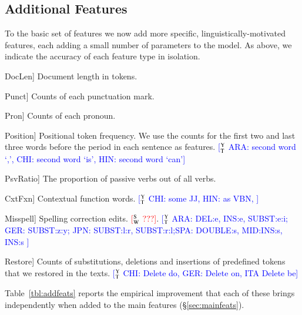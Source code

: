 \documentclass[11pt,letterpaper]{article}
\newcommand{\ensuretext}[1]{#1}
\newcommand{\swmarker}{\ensuretext{\textcolor{red}{\ensuremath{^{\textsc{S}}_{\textsc{W}}}}}}
\newcommand{\ytmarker}{\ensuretext{\textcolor{blue}{\ensuremath{^{\textsc{Y}}_{\textsc{T}}}}}}
\newcommand{\arkcomment}[3]{\ensuretext{\textcolor{#3}{[#1 #2]}}}
\newcommand{\sw}[1]{\arkcomment{\swmarker}{#1}{red}}
\newcommand{\yt}[1]{\arkcomment{\ytmarker}{#1}{blue}}
\newcommand{\Sref}[1]{\S\ref{#1}}
\newcommand{\Tref}[1]{Table~\ref{#1}}
\newcommand{\feat}[1]{\textsmaller[.5]{\textsf{#1}}} %
\begin{document}
\subsection{Additional Features}\label{sec:addfeats}
To the basic set of features we now add more specific,
linguistically-motivated features, each adding a small number of
parameters to the model.  As above, we indicate the accuracy of each
feature type in isolation.

\begin{compactdesc}
\item[\feat{DocLen}] Document length in tokens.
\item[\feat{Punct}] Counts of each punctuation mark. 
\item[\feat{Pron}] Counts of each pronoun.
\item[\feat{Position}] Positional token frequency. We use the counts
  for the first two and last three words before the period in each
  sentence as features. \yt{ARA: second word `,', CHI: second word `is', HIN: second word `can'}  
\item[\feat{PsvRatio}] The proportion of passive verbs out of all
  verbs.
\item[\feat{CxtFxn}] Contextual function words. \yt{CHI: some JJ, HIN: as VBN, } 
\item[\feat{Misspell}] Spelling correction edits. \sw{???}. \yt{ARA: DEL:e, INS:e, SUBST:e:i; GER: SUBST:z:y; JPN: SUBST:l:r, SUBST:r:l;SPA: DOUBLE:s, MID:INS:s, INS:s }
\item[\feat{Restore}] Counts of substitutions, deletions and
  insertions of predefined tokens that we restored in the texts. \yt{CHI: Delete do, GER: Delete on, ITA Delete be}  
\end{compactdesc}
\noindent
\Tref{tbl:addfeats} reports the empirical improvement that each of
these brings independently when added to the main features
(\Sref{sec:mainfeats}).
\end{document}
